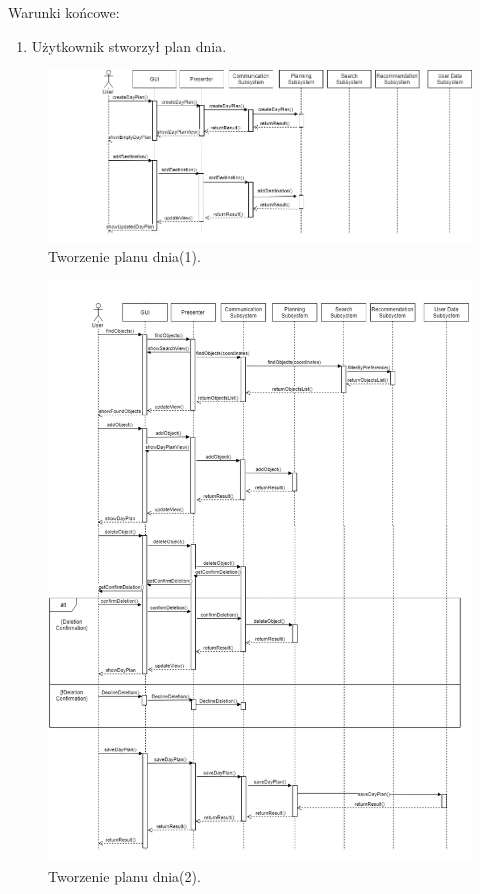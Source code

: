 \documentclass[10pt,twoside,a4paper]{report}
\begin{document}
\par
\noindent\newline
Warunki końcowe:
\begin{enumerate}
  \item Użytkownik stworzył plan dnia.
\end{enumerate}

\noindent\newline
\begin{figure}[h]
\centering
\includegraphics[width=\linewidth]{dayPlan1}
\caption{Tworzenie planu dnia(1).}
\label{fig:dayPlan1}
\end{figure}
\begin{figure}[h]
\centering
\includegraphics[width=\linewidth]{dayPlan2}
\caption{Tworzenie planu dnia(2).}
\label{fig:dayPlan2}
\end{figure}
\FloatBarrier
\end{document}
